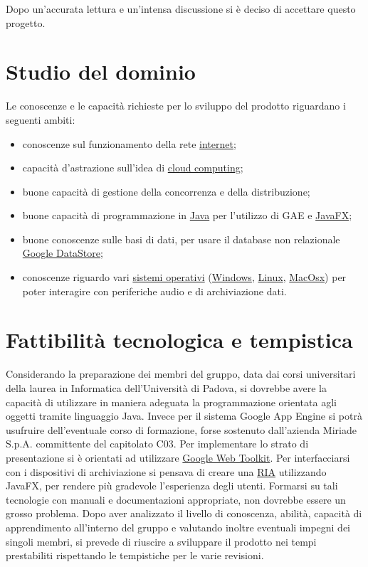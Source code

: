 Dopo un'accurata lettura e un'intensa discussione si \`e deciso di accettare
questo progetto.

\section{Studio del dominio} 
Le conoscenze e le capacit\`a richieste per lo sviluppo del prodotto
riguardano i seguenti ambiti:
\begin{itemize}
  \item conoscenze sul funzionamento della rete \underline{internet};
  \item capacit\`a d'astrazione sull'idea di \underline{cloud computing};
  \item buone capacit\`a di gestione della concorrenza e della distribuzione;
  \item buone capacit\`a di programmazione in \underline{Java} per l'utilizzo di
  GAE e \underline{JavaFX};
  \item buone conoscenze sulle basi di dati, per usare il database
  non relazionale \underline{Google DataStore};
  \item conoscenze riguardo vari \underline{sistemi operativi}
  (\underline{Windows}, \underline{Linux}, \underline{MacOsx}) per poter interagire con periferiche
  audio e di archiviazione dati.
\end{itemize}

\section{Fattibilit\`a tecnologica e tempistica}
Considerando la preparazione dei membri del gruppo, data dai corsi universitari
della laurea in Informatica dell'Universit\`a di Padova, si dovrebbe avere la
capacit\`a di utilizzare in maniera adeguata la programmazione orientata agli
oggetti tramite linguaggio Java. Invece per il sistema Google App Engine si
potr\`a usufruire dell'eventuale corso di formazione, forse sostenuto
dall'azienda Miriade S.p.A. committente del capitolato C03.
Per implementare lo strato di presentazione si \`e orientati ad utilizzare
\underline{Google Web Toolkit}. Per interfacciarsi con i dispositivi di
archiviazione si pensava di creare una \underline{RIA} utilizzando JavaFX, per
rendere pi\`u gradevole l'esperienza degli utenti. Formarsi su tali tecnologie con manuali e
documentazioni appropriate, non dovrebbe essere un grosso problema. Dopo aver
analizzato il livello di conoscenza, abilit\`a, capacit\`a di apprendimento
all'interno del gruppo e valutando inoltre eventuali impegni dei singoli membri,
si prevede di riuscire a sviluppare il prodotto nei tempi prestabiliti
rispettando le tempistiche per le varie revisioni.

